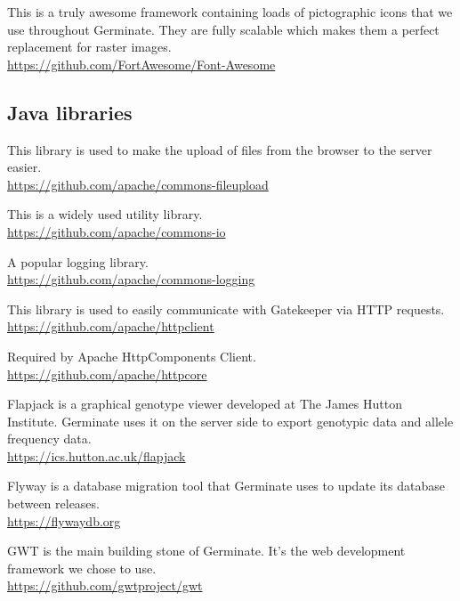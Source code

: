 \begin{description}[align=left,style=nextline,leftmargin=*,labelsep=\parindent,font=\bfseries]
	\item[Font Awesome] This is a truly awesome framework containing loads of pictographic icons that we use throughout Germinate. They are fully scalable which makes them a perfect replacement for raster images. \\\url{https://github.com/FortAwesome/Font-Awesome}
\end{description}

\subsection{Java libraries}
\begin{description}[align=left,style=nextline,leftmargin=*,labelsep=\parindent,font=\bfseries]
	\item[Apache Commons FileUpload] This library is used to make the upload of files from the browser to the server easier. \\\url{https://github.com/apache/commons-fileupload}
	\item[Apache Commons IO] This is a widely used utility library. \\\url{https://github.com/apache/commons-io}
	\item[Apache Commons Logging] A popular logging library. \\\url{https://github.com/apache/commons-logging}
	\item[Apache HttpComponents Client] This library is used to easily communicate with Gatekeeper via HTTP requests. \\\url{https://github.com/apache/httpclient}
	\item[Apache HttpComponents Core] Required by Apache HttpComponents Client. \\\url{https://github.com/apache/httpcore}
	\item[Flapjack] Flapjack is a graphical genotype viewer developed at The James Hutton Institute. Germinate uses it on the server side to export genotypic data and allele frequency data. \\\url{https://ics.hutton.ac.uk/flapjack}
	\item[Flyway] Flyway is a database migration tool that Germinate uses to update its database between releases.
	\\\url{https://flywaydb.org}
	\item[GWT] GWT is the main building stone of Germinate. It's the web development framework we chose to use. \\\url{https://github.com/gwtproject/gwt}

\end{description}
